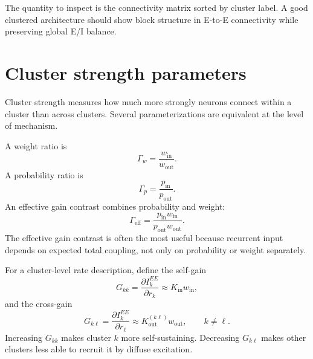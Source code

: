 The quantity to inspect is the connectivity matrix sorted by cluster label. A good clustered architecture should show block structure in E-to-E connectivity while preserving global E/I balance.

\section{Cluster strength parameters}
\label{sec:cluster-strength-parameters}

Cluster strength measures how much more strongly neurons connect within a cluster than across clusters. Several parameterizations are equivalent at the level of mechanism.

A weight ratio is
%
\begin{equation}
  \Gamma_w
  =
  \frac{w_{\mathrm{in}}}{w_{\mathrm{out}}}.
  \label{eq:weight-cluster-ratio}
\end{equation}
%
A probability ratio is
%
\begin{equation}
  \Gamma_p
  =
  \frac{p_{\mathrm{in}}}{p_{\mathrm{out}}}.
  \label{eq:probability-cluster-ratio}
\end{equation}
%
An effective gain contrast combines probability and weight:
%
\begin{equation}
  \Gamma_{\mathrm{eff}}
  =
  \frac{p_{\mathrm{in}}w_{\mathrm{in}}}
       {p_{\mathrm{out}}w_{\mathrm{out}}}.
  \label{eq:effective-cluster-ratio}
\end{equation}
%
The effective gain contrast is often the most useful because recurrent input depends on expected total coupling, not only on probability or weight separately.

For a cluster-level rate description, define the self-gain
%
\begin{equation}
  G_{kk}
  =
  \frac{\partial I_k^{EE}}{\partial r_k}
  \approx
  K_{\mathrm{in}}w_{\mathrm{in}},
  \label{eq:cluster-self-gain}
\end{equation}
%
and the cross-gain
%
\begin{equation}
  G_{k\ell}
  =
  \frac{\partial I_k^{EE}}{\partial r_{\ell}}
  \approx
  K_{\mathrm{out}}^{(k\ell)}w_{\mathrm{out}},
  \qquad k\neq\ell.
  \label{eq:cluster-cross-gain}
\end{equation}
%
Increasing $G_{kk}$ makes cluster $k$ more self-sustaining. Decreasing $G_{k\ell}$ makes other clusters less able to recruit it by diffuse excitation.

